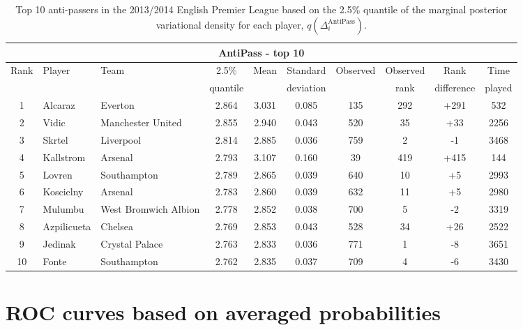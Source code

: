 \documentclass[11pt,a4paper]{article}
\begin{document}
\begin{table}%
\caption{Top 10 anti-passers in the 2013/2014 English Premier League based on the 2.5\% quantile of the marginal posterior variational density for each player, $q(\Delta_i^{\textrm{AntiPass}})$.} \label{tableantipass}
\centering
\footnotesize
\begin{tabular}{cllccccccc}
\hline
\multicolumn{10}{c}{AntiPass - top 10}\\
\hline
\multirow{2}{*}{Rank} & \multirow{2}{*}{Player} &  \multirow{2}{*}{Team} & 2.5\% & \multirow{2}{*}{Mean} & Standard & \multirow{2}{*}{Observed} & Observed & Rank & Time\\
 &  &  & quantile & & deviation &  & rank & difference & played \\
\hline
1 & Alcaraz 	& Everton & 	2.864  & 	3.031  & 	0.085  & 	135  & 292 & +291 &	 	532\\
2 & Vidic 	 & Manchester United  & 	2.855  & 	2.940  & 	0.043  & 	520  & 35 & +33 &	 	2256\\
3 & Skrtel 	 &  Liverpool & 	2.814  & 	2.885  & 	0.036  & 	759  & 2 & -1 &	 	3468\\
4 & Kallstrom 	&  Arsenal  & 	2.793  & 	3.107  & 	0.160  & 	39   & 419 & +415 &	  	144\\
5 & Lovren 	   & Southampton  & 	2.789  & 	2.865  & 	0.039  & 	640  & 10 & +5 &	 	2993\\
6 & Koscielny &	Arsenal &	  2.783  & 	2.860  & 	0.039  & 	632  & 11 & +5 &	 	2980\\
7 & Mulumbu 	& West Bromwich Albion & 	2.778  & 	2.852  & 	0.038  & 	700  & 5 & -2 &	 	3319\\
8 & Azpilicueta & Chelsea	&	  2.769  & 	2.853  & 	0.043  & 	528  & 34 & +26 &	 	2522\\
9 & Jedinak 	  &  Crystal Palace  & 	2.763  & 	2.833  & 	0.036  & 	771  & 1 & -8 &	 	3651\\
10 & Fonte 	   &  Southampton & 	2.762  & 	2.835  & 	0.037  & 	709  & 4 & -6 &	 	3430\\	
\hline
\end{tabular}
\end{table}

















\section{ROC curves based on averaged probabilities} \label{roc_curves}
\end{document}
